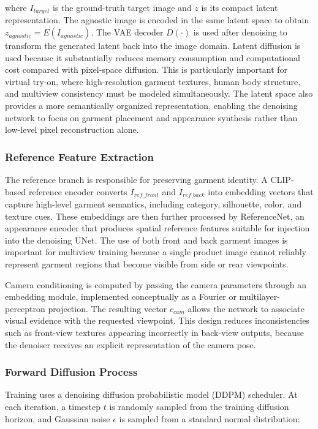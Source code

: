 where \(I_{target}\) is the ground-truth target image and \(z\) is its compact latent representation. The agnostic image is encoded in the same latent space to obtain \(z_{agnostic} = E(I_{agnostic})\). The VAE decoder \(D(\cdot)\) is used after denoising to transform the generated latent back into the image domain. Latent diffusion is used because it substantially reduces memory consumption and computational cost compared with pixel-space diffusion. This is particularly important for virtual try-on, where high-resolution garment textures, human body structure, and multiview consistency must be modeled simultaneously. The latent space also provides a more semantically organized representation, enabling the denoising network to focus on garment placement and appearance synthesis rather than low-level pixel reconstruction alone.

\subsubsection*{Reference Feature Extraction}
The reference branch is responsible for preserving garment identity. A CLIP-based reference encoder converts \(I_{ref\_front}\) and \(I_{ref\_back}\) into embedding vectors that capture high-level garment semantics, including category, silhouette, color, and texture cues. These embeddings are then further processed by ReferenceNet, an appearance encoder that produces spatial reference features suitable for injection into the denoising UNet. The use of both front and back garment images is important for multiview training because a single product image cannot reliably represent garment regions that become visible from side or rear viewpoints.

Camera conditioning is computed by passing the camera parameters through an embedding module, implemented conceptually as a Fourier or multilayer-perceptron projection. The resulting vector \(c_{cam}\) allows the network to associate visual evidence with the requested viewpoint. This design reduces inconsistencies such as front-view textures appearing incorrectly in back-view outputs, because the denoiser receives an explicit representation of the camera pose.

\subsubsection*{Forward Diffusion Process}
Training uses a denoising diffusion probabilistic model (DDPM) scheduler. At each iteration, a timestep \(t\) is randomly sampled from the training diffusion horizon, and Gaussian noise \(\epsilon\) is sampled from a standard normal distribution:

